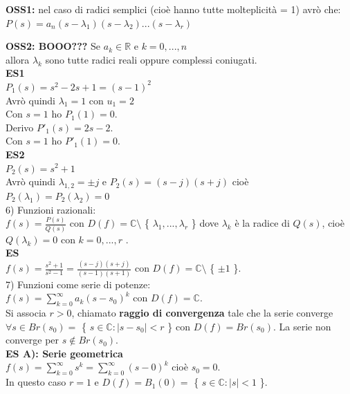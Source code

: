 \textbf{OSS1:} nel caso di radici semplici (cioè hanno tutte molteplicità = 1) avrò che:\\
$ P(s) = a_{n} (s- \lambda_{1}) (s- \lambda_{2}) ... (s- \lambda_{r}) $

\textbf{OSS2: BOOO???} Se $ a_{k} \in \mathbb{R}$ e $ k=0,...,n $ \\
allora $ \lambda_{k}$ sono tutte radici reali oppure complessi coniugati.\\

\textbf{ES1}\\
$ P_{1}(s) = s^{2} -2s +1 = (s-1)^{2}$\\
Avrò quindi $ \lambda_{1} = 1$ con $ u_{1} = 2$\\
Con $ s=1 $ ho $ P_{1}(1) = 0$.\\
Derivo $ P'_{1}(s) = 2s - 2$.\\
Con $ s=1 $ ho $ P'_{1}(1) = 0$.\\

\textbf{ES2}\\
$ P_{2}(s) = s^{2} +1$\\
Avrò quindi $ \lambda_{1,2} = \pm j$ e $ P_{2}(s) = (s-j)(s+j)$ cioè $ P_{2}( \lambda_{1})=P_{2}( \lambda_{2})=0$\\

6) Funzioni razionali:\\
$ f(s) = \frac{ P(s)}{Q(s)}$ con $ D(f) = \mathbb{C} \setminus$ \{ $ \lambda_{1},..., \lambda_{r}$ \} dove $ \lambda_{k}$ è la radice di $ Q(s)$, cioè $ Q( \lambda_{k})=0$ con $ k=0,...,r$ .\\

\textbf{ES}\\
$ f(s) = \frac{ s^{2}+1}{ s^{2} -1}= \frac{ (s-j)(s+j) }{ (s-1)(s+1)} $ con $ D(f) = \mathbb{C} \setminus$ \{ $ \pm 1$ \}. \\

7) Funzioni come serie di potenze:\\
$ f(s) = \sum_{k=0}^\infty a_{k} (s-s_0)^{k}$ con $ D(f)= \mathbb{C} $. \\
Si associa $r>0$, chiamato \textbf{raggio di convergenza} tale che la serie converge $ \forall s \in Br(s_0) = $ \{ $ s \in \mathbb{C} : |s-s_0| < r$ \} con $ D(f)=Br(s_0)$. La serie non converge per $ s \notin Br(s_0)$.\\

\textbf{ES A): Serie geometrica}\\
$ f(s) = \sum_{k=0}^\infty s^{k} = \sum_{k=0}^\infty (s-0)^{k}$ cioè $s_0= 0$.\\
In questo caso $r=1$ e $ D(f)=B_1(0)=$ \{ $ s \in \mathbb{C} : |s| < 1$ \}.

